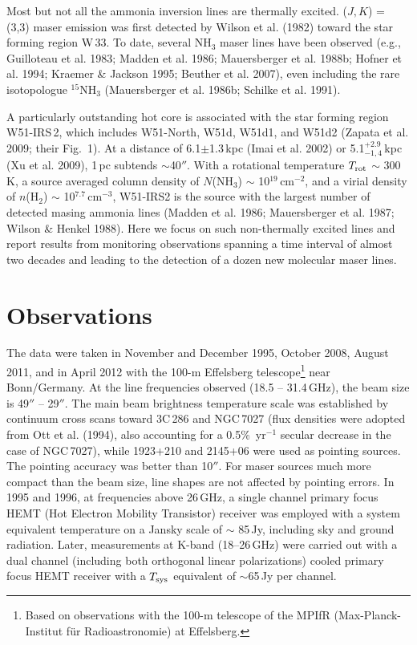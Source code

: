 \documentclass[oldversion]{aa}
\begin{document}
Most but not all the ammonia inversion lines are thermally excited. ($J,K$) 
= (3,3) maser emission was first detected by Wilson et al. (1982) toward 
the star forming region W\,33. To date, several NH$_3$ maser lines have been
observed (e.g., Guilloteau et al. 1983; Madden et al. 1986; Mauersberger et 
al. 1988b; Hofner et al. 1994; Kraemer \& Jackson 1995; Beuther et al. 
2007), even including the rare isotopologue $^{15}$NH$_3$ (Mauersberger et 
al. 1986b; Schilke et al. 1991). 

A particularly outstanding hot core is associated with the star forming 
region W51-IRS\,2, which includes W51-North, W51d, W51d1, and W51d2 
(Zapata et al. 2009; their Fig.~1). At a distance of 6.1$\pm$1.3\,kpc 
(Imai et al. 2002) or 5.1$^{+2.9}_{-1,4}$\,kpc (Xu et al. 2009), 1\,pc 
subtends $\sim$40$''$.  With a rotational temperature $T_{\rm rot}$ $\sim$ 
300\,K, a source averaged column density of $N$(NH$_3$) $\sim$ 
10$^{19}$\,cm$^{-2}$, and a virial density of $n$(H$_2$) $\sim$ 
10$^{7.7}$\,cm$^{-3}$, W51-IRS2 is the source with the largest number of 
detected masing ammonia lines (Madden et al. 1986; Mauersberger et al. 1987; 
Wilson \& Henkel 1988). Here we focus on such non-thermally excited 
lines and report results from monitoring observations spanning a time 
interval of almost two decades and leading to the detection of a dozen 
new molecular maser lines.


\section{Observations}

The data were taken in November and December 1995, October 2008, 
August 2011, and in April 2012 with the 100-m Effelsberg 
telescope\footnote{Based on observations with the 100-m telescope of
the MPIfR (Max-Planck-Institut f{\"u}r Radioastronomie) at Effelsberg.} 
near Bonn/Germany. At the line frequencies observed (18.5 -- 31.4\,GHz), 
the beam size is 49$''$ -- 29$''$. The main beam brightness temperature scale 
was established by continuum cross scans toward 3C\,286 and NGC\,7027 
(flux densities were adopted from Ott et al. (1994), also accounting 
for a 0.5\%~yr$^{-1}$ secular decrease in the case of NGC\,7027), while 
1923+210 and 2145+06 were used as pointing sources. The pointing accuracy 
was better than 10$''$. For maser sources much more compact than the 
beam size, line shapes are not affected by pointing errors. In 1995 
and 1996, at frequencies above 26\,GHz, a single channel primary focus 
HEMT (Hot Electron Mobility Transistor) receiver was employed with a 
system equivalent temperature on a Jansky scale of $\sim $ 85\,Jy, 
including sky and ground radiation. Later, measurements at K-band 
(18--26\,GHz) were carried out with a dual channel (including both 
orthogonal linear polarizations) cooled primary focus HEMT receiver 
with a $T_{\rm sys}$ equivalent of $\sim$65\,Jy per channel. 
\end{document}
